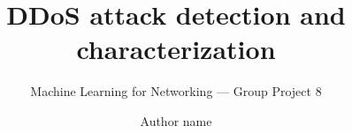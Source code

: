 \documentclass[sigconf,nonacm]{acmart}
\begin{document}
\title{DDoS attack detection and characterization}
\subtitle{Machine Learning for Networking --- Group Project 8}

\author{Author name}
\renewcommand{\shortauthors}{Project group}

\maketitle



\end{document}
